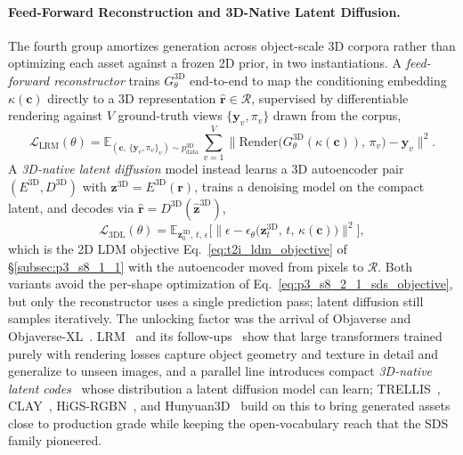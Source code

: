 \paragraph{Feed-Forward Reconstruction and 3D-Native Latent Diffusion.}
\label{para:p3_s8_2_1_lrm}
The fourth group amortizes generation across object-scale 3D corpora rather than optimizing each asset against a frozen 2D prior, in two instantiations.
A \emph{feed-forward reconstructor} trains $G_\theta^{\text{3D}}$ end-to-end to map the conditioning embedding $\kappa(\mathbf{c})$ directly to a 3D representation $\hat{\mathbf{r}}\!\in\!\mathcal{R}$, supervised by differentiable rendering against $V$ ground-truth views $\{\mathbf{y}_v,\pi_v\}$ drawn from the corpus,
\begin{equation}
\mathcal{L}_{\text{LRM}}(\theta)
=
\mathbb{E}_{(\mathbf{c},\,\{\mathbf{y}_v,\pi_v\}_v)\sim p_{\text{data}}^{\text{3D}}}\,
\sum_{v=1}^V \big\|\mathrm{Render}\big(G_\theta^{\text{3D}}(\kappa(\mathbf{c})),\,\pi_v\big) - \mathbf{y}_v\big\|^2.
\label{eq:p3_s8_2_1_lrm_objective}
\end{equation}
A \emph{3D-native latent diffusion} model instead learns a 3D autoencoder pair $(E^{\text{3D}}, D^{\text{3D}})$ with $\mathbf{z}^{\text{3D}}\!=\!E^{\text{3D}}(\mathbf{r})$, trains a denoising model on the compact latent, and decodes via $\hat{\mathbf{r}}=D^{\text{3D}}(\hat{\mathbf{z}}^{\text{3D}})$,
\begin{equation}
\mathcal{L}_{\text{3DL}}(\theta)
=
\mathbb{E}_{\mathbf{z}^{\text{3D}}_0,\,t,\,\epsilon}\Big[\big\|\epsilon - \epsilon_\theta\big(\mathbf{z}^{\text{3D}}_t,\,t,\,\kappa(\mathbf{c})\big)\big\|^2\Big],
\label{eq:p3_s8_2_1_latdiff_objective}
\end{equation}
which is the 2D LDM objective Eq.~\eqref{eq:t2i_ldm_objective} of §\ref{subsec:p3_s8_1_1} with the autoencoder moved from pixels to $\mathcal{R}$.
Both variants avoid the per-shape optimization of Eq.~\eqref{eq:p3_s8_2_1_sds_objective}, but only the reconstructor uses a single prediction pass; latent diffusion still samples iteratively.
The unlocking factor was the arrival of Objaverse and Objaverse-XL~\cite{deitke2023objaverse, deitke2023objaversexl}.
LRM~\cite{hong2023lrm} and its follow-ups~\cite{tang2024lgm, wang2024crm, wang2025moving} show that large transformers trained purely with rendering losses capture object geometry and texture in detail and generalize to unseen images, and a parallel line introduces compact \emph{3D-native latent codes}~\cite{chen20253dtopia, zhang20233dshape2vecset, ye2022structured, yang2025prometheus} whose distribution a latent diffusion model can learn; TRELLIS~\cite{xiang2025trellis}, CLAY~\cite{zhang2024clay}, HiGS-RGBN~\cite{shen2025highGSRGBN}, and Hunyuan3D~\cite{yang2024hunyuan3d} build on this to bring generated assets close to production grade while keeping the open-vocabulary reach that the SDS family pioneered.

